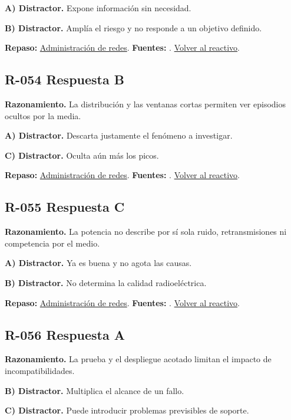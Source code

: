 \textbf{A) Distractor. }Expone información sin necesidad.

\textbf{B) Distractor. }Amplía el riesgo y no responde a un objetivo definido.

\textbf{Repaso:} \hyperref[sec:r2]{Administración de redes}. \textbf{Fuentes:} \cite{rfc2131,rfc1034,rfc9293,networks}. \hyperref[q:R-053]{Volver al reactivo}.\par\medskip

\subsection*{R-054 \quad Respuesta B}\label{s:R-054}
\textbf{Razonamiento.} La distribución y las ventanas cortas permiten ver episodios ocultos por la media.

\textbf{A) Distractor. }Descarta justamente el fenómeno a investigar.

\textbf{C) Distractor. }Oculta aún más los picos.

\textbf{Repaso:} \hyperref[sec:r2]{Administración de redes}. \textbf{Fuentes:} \cite{rfc2131,rfc1034,rfc9293,networks}. \hyperref[q:R-054]{Volver al reactivo}.\par\medskip

\subsection*{R-055 \quad Respuesta C}\label{s:R-055}
\textbf{Razonamiento.} La potencia no describe por sí sola ruido, retransmisiones ni competencia por el medio.

\textbf{A) Distractor. }Ya es buena y no agota las causas.

\textbf{B) Distractor. }No determina la calidad radioeléctrica.

\textbf{Repaso:} \hyperref[sec:r2]{Administración de redes}. \textbf{Fuentes:} \cite{rfc2131,rfc1034,rfc9293,networks}. \hyperref[q:R-055]{Volver al reactivo}.\par\medskip

\subsection*{R-056 \quad Respuesta A}\label{s:R-056}
\textbf{Razonamiento.} La prueba y el despliegue acotado limitan el impacto de incompatibilidades.

\textbf{B) Distractor. }Multiplica el alcance de un fallo.

\textbf{C) Distractor. }Puede introducir problemas previsibles de soporte.

